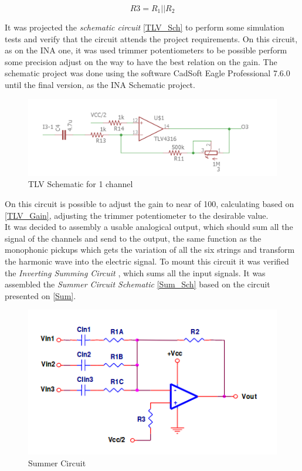 \begin{equation}
\label{R3}
R3=R_1||R_2
\end{equation}

It was projected the \textit{schematic circuit} \autoref{TLV_Sch} to perform some simulation tests and verify that the circuit attends the project
requirements. On this circuit, as on the INA one, it was used trimmer potentiometers to be possible perform some precision adjust on the way to have
the best relation on the gain. The schematic project was done using the software CadSoft Eagle Professional 7.6.0 until the final version, as the INA
Schematic project.

\begin{figure}[!htpb]
\centering
\caption{TLV Schematic for 1 channel}
\label{TLV_Sch}
\includegraphics[scale=0.4]{images/TLV_1ch}
\end{figure}

On this circuit is possible to adjust the gain to near of 100, calculating based on \autoref{TLV_Gain}, adjusting the trimmer potentiometer to the desirable value.\\

It was decided to assembly a usable analogical output, which should sum all the signal of the channels and send to the output, the same function as the monophonic pickups which gets
the variation of all the six strings and transform the harmonic wave into the electric signal. To mount this circuit it was verified the \textit{Inverting Summing Circuit} \cite{OpAmps},
which sums all the input signals. It was assembled the \textit{Summer Circuit Schematic} \autoref{Sum_Sch} based on the circuit presented on \autoref{Sum}.

\begin{figure}[!htpb]
\centering
\caption{Summer Circuit}
\label{Sum}
\includegraphics[scale=1]{images/sum}
\end{figure}


